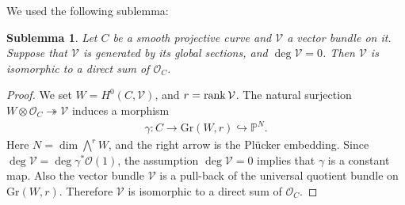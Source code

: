 \documentclass[11pt]{amsart}
\theoremstyle{plain}
\newtheorem{sublem}[thm]{Sublemma}
\theoremstyle{definition}
\theoremstyle{remark}
\newcommand{\oO}{\mathcal{O}}
\newcommand{\vV}{\mathcal{V}}
\newcommand{\rank}{\mathop{\rm rank}\nolimits}
\begin{document}
We used the following sublemma: 
\begin{sublem}\label{sublem1}
Let $C$ be a smooth projective curve and 
$\vV$ a vector bundle on it. 
Suppose that $\vV$ is generated by its global sections, 
and $\deg \vV=0$. 
Then $\vV$ is isomorphic to a direct sum of 
$\oO_C$.
\end{sublem}
\begin{proof}
We set $W=H^0(C, \vV)$, and 
$r=\rank \vV$. 
The natural surjection 
$W \otimes \oO_C \twoheadrightarrow \vV$
induces a morphism
\begin{align*}
\gamma \colon C \to \mathrm{Gr}(W, r) \hookrightarrow 
\mathbb{P}^N. 
\end{align*}
Here $N=\dim \bigwedge^r W$, 
and the right arrow is the Pl{\"u}cker embedding. 
Since $\deg \vV=\deg \gamma^{\ast}\oO(1)$, 
the assumption $\deg \vV=0$ implies that 
$\gamma$ is a constant map. 
Also the vector bundle $\vV$ is a pull-back of the universal 
quotient bundle
 on $\mathrm{Gr}(W, r)$.
Therefore
$\vV$ is isomorphic to a direct sum of $\oO_C$. 
\end{proof}
\end{document}
